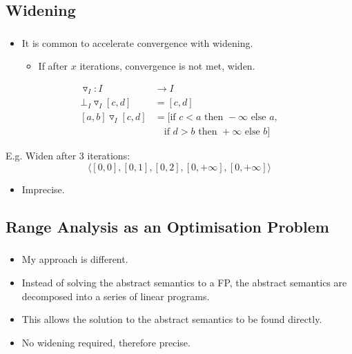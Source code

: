 \documentclass[compress]{beamer}
\begin{document}
\subsection{Widening}
\begin{frame}[fragile]
	\frametitle{\insertsubsection}

	\begin{itemize}
	\item It is common to accelerate convergence with widening.
		\begin{itemize}
		\item If after $x$ iterations, convergence is not met, widen.
		\end{itemize}
	\end{itemize}

	\vfill

	\[
	\begin{aligned}
	\triangledown_I : I &\rightarrow I\\
	\bot_I \triangledown_I [c, d] &= [c, d]\\
	[a, b] \triangledown_I [c, d] &= [\text{if~} c < a \text{~then~} -\infty \text{~else~} a,\\
		&~~~\text{~if~} d >b \text{~then~} +\infty \text{~else~} b]
	\end{aligned}
	\]

	\vfill

	E.g. Widen after 3 iterations:
	\[
	\langle [0, 0], [0, 1], [0, 2], [0, +\infty], [0, +\infty]\rangle
	\]

	\vfill


	\begin{itemize}
	\item Imprecise.
	\end{itemize}

\end{frame}


\subsection{Range Analysis as an Optimisation Problem}
\begin{frame}[fragile]
	\frametitle{\insertsubsection}

	\begin{itemize}
	\item My approach is different.

	\vfill

	\item Instead of solving the abstract semantics to a FP, the abstract semantics are decomposed into a series of linear programs.

	\vfill

	\item This allows the solution to the abstract semantics to be found directly.

	\vfill

	\item No widening required, therefore precise.

	\end{itemize}

\end{frame}
\end{document}
